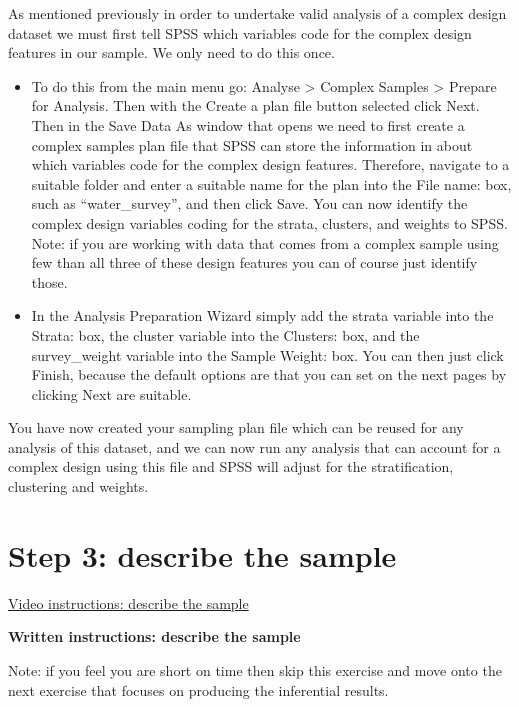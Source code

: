 \documentclass[
]{book}
\begin{document}
As mentioned previously in order to undertake valid analysis of a complex design dataset we must first tell SPSS which variables code for the complex design features in our sample. We only need to do this once.

\begin{itemize}
\item
  To do this from the main menu go: Analyse \textgreater{} Complex Samples \textgreater{} Prepare for Analysis. Then with the Create a plan file button selected click Next. Then in the Save Data As window that opens we need to first create a complex samples plan file that SPSS can store the information in about which variables code for the complex design features. Therefore, navigate to a suitable folder and enter a suitable name for the plan into the File name: box, such as ``water\_survey'', and then click Save. You can now identify the complex design variables coding for the strata, clusters, and weights to SPSS. Note: if you are working with data that comes from a complex sample using few than all three of these design features you can of course just identify those.
\item
  In the Analysis Preparation Wizard simply add the strata variable into the Strata: box, the cluster variable into the Clusters: box, and the survey\_weight variable into the Sample Weight: box. You can then just click Finish, because the default options are that you can set on the next pages by clicking Next are suitable.
\end{itemize}

You have now created your sampling plan file which can be reused for any analysis of this dataset, and we can now run any analysis that can account for a complex design using this file and SPSS will adjust for the stratification, clustering and weights.

\hypertarget{step-3-describe-the-sample}{%
\section{Step 3: describe the sample}\label{step-3-describe-the-sample}}

\href{https://youtu.be/tCDLVDrBN-g}{Video instructions: describe the sample}

\textbf{Written instructions: describe the sample}

Note: if you feel you are short on time then skip this exercise and move onto the next exercise that focuses on producing the inferential results.
\end{document}

